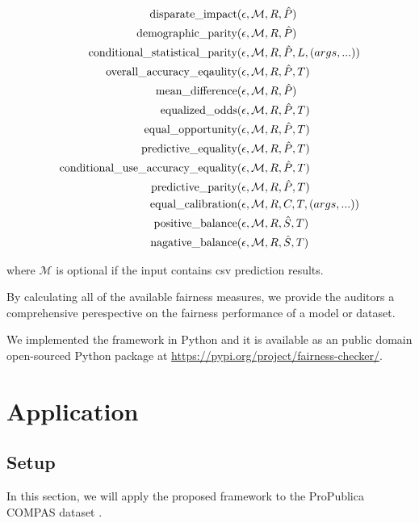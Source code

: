 \documentclass[conference]{IEEEtran}
\begin{document}
\begin{align*}
\text{disparate\_impact} & (\epsilon, \mathcal{M}, R, \hat{P}) \\
\text{demographic\_parity} & (\epsilon, \mathcal{M}, R, \hat{P}) \\
\text{conditional\_statistical\_parity} & (\epsilon, \mathcal{M}, R, \hat{P}, L, (args, ...)) \\
\text{overall\_accuracy\_eqaulity} & (\epsilon, \mathcal{M}, R, \hat{P}, T) \\
\text{mean\_difference} & (\epsilon, \mathcal{M}, R, \hat{P}) \\
\text{equalized\_odds} & (\epsilon, \mathcal{M}, R, \hat{P}, T) \\
\text{equal\_opportunity} & (\epsilon, \mathcal{M}, R, \hat{P}, T) \\
\text{predictive\_equality} & (\epsilon, \mathcal{M}, R, \hat{P}, T) \\
\text{conditional\_use\_accuracy\_equality} & (\epsilon, \mathcal{M}, R, \hat{P}, T) \\
\text{predictive\_parity} & (\epsilon, \mathcal{M}, R, \hat{P}, T) \\
\text{equal\_calibration} & (\epsilon, \mathcal{M}, R, C, T, (args, ...)) \\
\text{positive\_balance} & (\epsilon, \mathcal{M}, R, \hat{S}, T) \\
\text{nagative\_balance} & (\epsilon, \mathcal{M}, R, \hat{S}, T) \\
\end{align*}

where $\mathcal{M}$ is optional if the input contains csv prediction results.

By calculating all of the available fairness measures, we provide the auditors a comprehensive perespective on the fairness performance of a model or dataset.

We implemented the framework in Python and it is available as an public domain open-sourced Python package at \url{https://pypi.org/project/fairness-checker/}.

\section{Application}
\subsection{Setup}
\label{sec:app}
In this section, we will apply the proposed framework to the ProPublica COMPAS dataset \cite{angwin2016machine,larson2016compas,larson2016propublica}.
\end{document}
